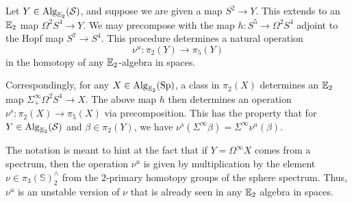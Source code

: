 \begin{obs}Let $Y\in \operatorname{\mathrm{Alg}}_{\operatorname{\mathbb{E}}_2}(\operatorname{\mathcal{S}})$, and suppose we are given a map $S^2\to Y$.  This extends to an $\operatorname{\mathbb{E}}_2$ map $\Omega^2 S^4 \to Y.$  We may precompose with the map $h: S^5 \to \Omega^2 S^4$ adjoint to the Hopf map $S^7\to S^4$.  This procedure determines a natural operation $$\nu^u: \pi_2(Y) \to \pi_5(Y)$$ in the homotopy of any $\operatorname{\mathbb{E}}_2$-algebra in spaces.  

Correspondingly, for any $X\in \operatorname{\mathrm{Alg}}_{\operatorname{\mathbb{E}}_2}(\operatorname{\mathrm{Sp}})$, a class in $\pi_2(X)$ determines an $\operatorname{\mathbb{E}}_2$ map $\Sigma^{\infty}_+ \Omega^2 S^4 \to X$.  The above map $h$ then determines an operation $\nu^s :\pi_2(X) \to \pi_5(X)$ via precomposition.  This has the property that for $Y\in \operatorname{\mathrm{Alg}}_{\operatorname{\mathbb{E}}_2}(\operatorname{\mathcal{S}})$ and $\beta \in \pi_2(Y)$, we have $\nu^s(\Sigma^{\infty} \beta) = \Sigma^{\infty} \nu^u (\beta).$
\end{obs}

\begin{rmk} \label{rmk:multnu}
The notation is meant to hint at the fact that if $Y = \Omega^\infty X$ comes from a spectrum, then the operation $\nu^u$ is given by multiplication by the element $\nu \in \pi_3(\mathbb{S})^{\wedge}_2$ from the $2$-primary homotopy groups of the sphere spectrum.  Thus, $\nu^u$ is an unstable version of $\nu$ that is already seen in any $\operatorname{\mathbb{E}}_2$ algebra in spaces.    %
\end{rmk}

